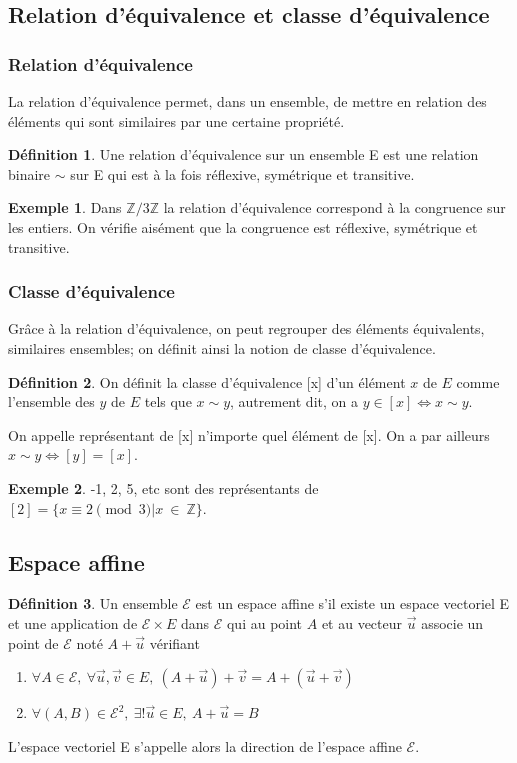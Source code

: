 \documentclass[a4paper,12pt,titlepage]{article}
\theoremstyle{plain}
\theoremstyle{definition}
\newtheorem{defi}{Définition}
\newtheorem{ex}{Exemple}
\begin{document}
\subsection{Relation d'équivalence et classe d'équivalence}
\subsubsection{Relation d'équivalence}
La relation d'équivalence permet, dans un ensemble, de mettre en relation des éléments qui sont similaires par une certaine propriété.
\begin{defi}
Une relation d'équivalence sur un ensemble E est une relation binaire $\sim$ sur E qui est à la fois réflexive, symétrique et transitive.
\end{defi}
\begin{ex}
Dans $\mathbb{Z}/3\mathbb{Z}$ la relation d'équivalence correspond à la congruence sur les entiers. On vérifie aisément que la congruence est réflexive, symétrique et transitive.
\end{ex}
\subsubsection{Classe d'équivalence}
Grâce à la relation d'équivalence, on peut regrouper des éléments équivalents, similaires ensembles; on définit ainsi la notion de classe d'équivalence.
\begin{defi}
On définit la classe d'équivalence [x] d'un élément $x$ de $E$ comme l'ensemble des $y$ de $E$ tels que $x \sim  y$, autrement dit, on a $y \in [x] \Leftrightarrow x \sim  y$.
\end{defi}
\noindent On appelle représentant de [x] n'importe quel élément de [x]. On a par ailleurs $x \sim  y \Leftrightarrow  [y] = [x]$.
\begin{ex}
-1, 2, 5, etc sont des représentants de $[2] = \{x \equiv 2 \pmod{3}|x~\in~\mathbb{Z}\}$.
\end{ex}
\subsection{Espace affine}
\begin{defi}
Un ensemble $\mathcal{E}$ est un espace affine s'il existe un espace vectoriel E et une application de $\mathcal{E} \times E$ dans $\mathcal{E}$ qui au point $A$ et au vecteur $\overrightarrow{u}$ associe un point de $\mathcal{E}$ noté $A+\overrightarrow{u}$ vérifiant

\begin{enumerate}
\item $ \forall A \in \mathcal{E},~\forall \overrightarrow{u},\overrightarrow{v} \in E,~(A+\overrightarrow{u})+\overrightarrow{v}=A+(\overrightarrow{u}+\overrightarrow{v})$
\item $ \forall (A,B) \in \mathcal{E}^2,~\exists!\overrightarrow{u} \in E,~ A+\overrightarrow{u}=B$
\end{enumerate}
L'espace vectoriel E s'appelle alors la direction de l'espace affine $\mathcal{E}$.
\end{defi}
\end{document}
